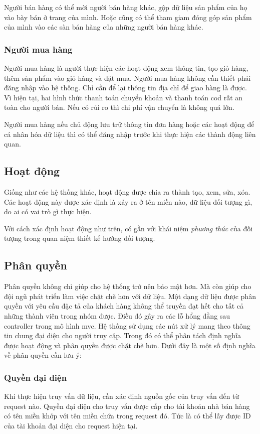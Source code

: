 Người bán hàng có thể mời người bán hàng khác, gộp dữ liệu sản phẩm của họ vào bày bán ở trang của mình. Hoặc cũng có thể tham giam đóng góp sản phẩm của mình vào các sàn bán hàng của những người bán hàng khác.

\subsubsection{Người mua hàng}
Người mua hàng là người thực hiện các hoạt động xem thông tin, tạo giỏ hàng, thêm sản phẩm vào giỏ hàng và đặt mua. Người mua hàng không cần thiết phải đăng nhập vào hệ thống. Chỉ cần để lại thông tin địa chỉ để giao hàng là được. Vì hiện tại, hai hình thức thanh toán chuyển khoản và thanh toán \acrshort{cod} rất an toàn cho người bán. Nếu có rủi ro thì chi phí vận chuyển là không quá lớn.

Người mua hàng nếu chủ động lưu trữ thông tin đơn hàng hoặc các hoạt động để cá nhân hóa dữ liệu thì có thể đăng nhập trước khi thực hiện các thành động liên quan.

\subsection{Hoạt động}
Giống như các hệ thống khác, hoạt động được chia ra thành tạo, xem, sửa, xóa. Các hoạt động này được xác định là xảy ra ở tên miền nào, dữ liệu đối tượng gì, do ai có vai trò gì thực hiện.

Với cách xác định hoạt động như trên, có gần với khái niệm \emph{phương thức} của đối tượng trong quan niệm thiết kế hướng đối tượng.

\subsection{Phân quyền}

Phân quyền không chỉ giúp cho hệ thống trở nên bảo mật hơn. Mà còn giúp cho đội ngũ phát triển làm việc chặt chẽ hơn với dữ liệu. Một dạng dữ liệu được phân quyền với yêu cầu đặc tả của khách hàng không thể truyền đạt hết cho tất cả những thành viên trong nhóm được. Điều đó gây ra các lỗ hổng đằng sau \gls{controller} trong mô hình \acrshort{mvc}. Hệ thống sử dụng các nút xử lý mang theo thông tin chung đại diện cho người truy cập. Trong đó có thể phân tách định nghĩa được hoạt động và phân quyền được chặt chẽ hơn. Dưới đây là một số định nghĩa về phân quyền cần lưu ý:

\subsubsection{Quyền đại diện}\label{what-is-owner}
Khi thực hiện truy vấn dữ liệu, cần xác định nguồn gốc của truy vấn đến từ \gls{request} \cite{http} nào. Quyền đại diện cho truy vấn được cấp cho tài khoản nhà bán hàng có tên miền khớp với tên miền chứa trong \gls{request} đó. Tức là có thể lấy được ID của tài khoản đại diện cho \gls{request} hiện tại. 

